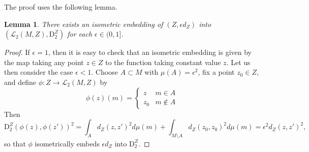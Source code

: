 \documentclass{article}
\newtheorem{lemma}[proposition]{Lemma}
\theoremstyle{definition}
\newcommand{\Lpp}[1]{\mathcal{L}_{#1}}
\newcommand{\dz}[1]{\mathrm{D}^Z_{#1}}
\begin{document}
The proof uses the following lemma.

\begin{lemma}\label{lem:Z_embedding}
    There exists an isometric embedding of $(Z,\epsilon d_Z)$ into $(\Lpp{2}(M,Z),\dz{2})$ for each $\epsilon \in (0,1]$.
\end{lemma}

\begin{proof}
    If $\epsilon = 1$, then it is easy to check that an isometric embedding is given by the map taking any point $z \in Z$ to the function taking constant value $z$. Let us then consider the case $\epsilon < 1$. Choose $A \subset M$ with $\mu(A) = \epsilon^2$, fix a point $z_0 \in Z$, and define $\phi:Z \to \Lpp{2}(M,Z)$ by
    \[
    \phi(z)(m) = \left\{
    \begin{array}{rl}
    z & m \in A \\
    z_0 & m \not \in A
    \end{array}\right.
    \]
    Then
    \[
    \dz{2}(\phi(z),\phi(z'))^2 = \int_A d_Z(z,z')^2 d\mu(m) + \int_{M \setminus A} d_Z(z_0,z_0)^2 d\mu(m) = \epsilon^2 d_Z(z,z')^2,
    \]
    so that $\phi$ isometrically embeds $\epsilon d_Z$ into $\dz{2}$. 
\end{proof}
\end{document}
